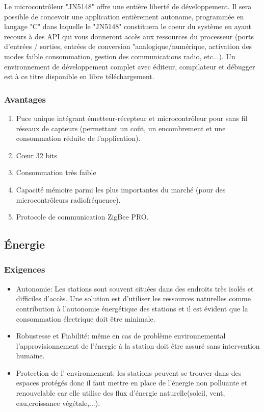 Le microcontr\^oleur "JN5148" offre une entière libert\'e de d\'eveloppement. Il sera possible de concevoir une application entièrement autonome, programm\'ee en langage "C" dans laquelle le "JN5148" constituera le coeur du système en ayant recours à des API qui vous donneront accès aux ressources du processeur (ports d'entr\'ees / sorties, entr\'ees de conversion "analogique/num\'erique, activation des modes faible consommation, gestion des communications radio, etc...). Un environnement de d\'eveloppement complet avec \'editeur, compilateur et d\'ebugger est à ce titre disponible en libre téléchargement.

\subsubsection{Avantages}  

\begin{enumerate}
	\item  Puce unique int\'egrant \'emetteur-r\'ecepteur et microcontr\^oleur pour sans fil r\'eseaux de capteurs (permettant un coût, un encombrement et une consommation r\'eduite de l’application).
	\item Cœur 32 bits
	\item Consommation très faible  
	\item Capacit\'e m\'emoire parmi les plus importantes du march\'e (pour des microcontr\^oleurs radiofr\'equence).
	\item Protocole de communication ZigBee PRO.
\end{enumerate}

\subsection{Énergie}

\subsubsection{Exigences}
\begin{itemize}

\item Autonomie: Les stations sont souvent situées dans des endroits très isolés et difficiles d'accès. Une solution est d'utiliser les ressources naturelles comme contribution à l'autonomie énergétique des stations et il est évident que la consommation électrique doit être minimale.

\smallskip \item Robustesse et Fiabilité: même en cas de problème environnemental l'approvisionnement de l'énergie à la station doit être assuré sans intervention humaine.

\smallskip \item Protection de l' environnement: les stations peuvent se trouver dans des espaces prot\'{e}g\'{e}s donc il faut mettre en place de l'\'{e}nergie non polluante et renouvelable car elle utilise des flux d'\'{e}nergie naturelle(soleil, vent, eau,croissance v\'{e}g\'{e}tale,...).
\end{itemize}

